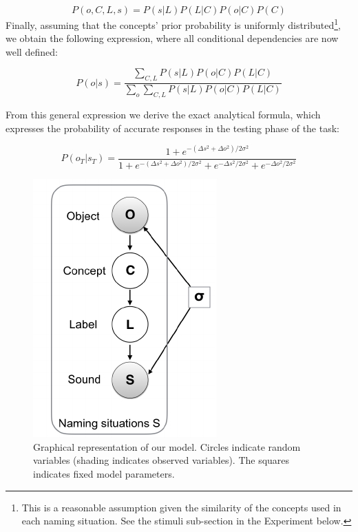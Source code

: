 \documentclass[10pt, letterpaper]{article}
\newenvironment{CodeChunk}{}{}
\begin{document}
\[P(o,C,L,s) = P(s|L)P(L|C)P(o|C)P(C) \] Finally, assuming that the
concepts' prior probability is uniformly
distributed\footnote{This is a reasonable assumption given the similarity of the concepts used in each naming situation. See the stimuli sub-section in the Experiment below.},
we obtain the following expression, where all conditional dependencies
are now well defined:

\[
P(o|s) = \frac{\sum_{C,L} P(s|L)P(o|C)P(L|C)}{\sum_{o} \sum_{C,L} P(s|L)P(o|C)P(L|C)}
\]

From this general expression we derive the exact analytical formula,
which expresses the probability of accurate responses in the testing
phase of the task:

\begin{equation}
P(o_T|s_T)= \frac{1 + e^{-(\Delta s^2 + \Delta o^2) /2\sigma^2}}{1 + e^{-(\Delta s^2 + \Delta o^2) /2\sigma^2} + e^{-\Delta s^2 /2\sigma^2} + e^{-\Delta o^2 /2\sigma^2 }}
\end{equation}

\begin{CodeChunk}
\begin{figure}[t]

{\centering \includegraphics{figs/model-1} 

}

\caption{\label{fig:model}Graphical representation of our model. Circles indicate random variables (shading indicates observed variables). The squares indicates fixed model parameters.}\label{fig:model}
\end{figure}
\end{CodeChunk}
\end{document}
